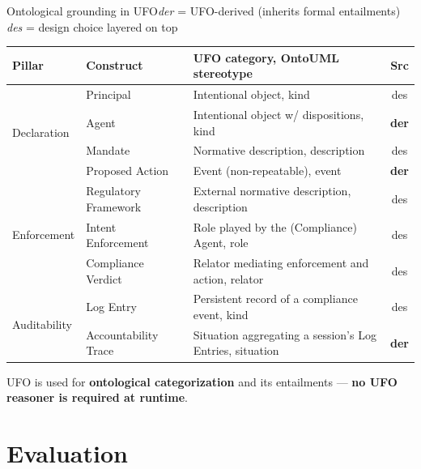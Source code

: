 \documentclass[aspectratio=169,10pt]{beamer}
\newcommand{\uml}[1]{\guillemotleft #1\guillemotright}
\newcommand{\key}[1]{\textcolor{aiAccent}{\textbf{#1}}}
\begin{document}
\begin{frame}{Ontological grounding in UFO}{\emph{der} = UFO-derived (inherits formal entailments) \quad \emph{des} = design choice layered on top}
  \centering\small
  \begin{tabularx}{0.97\textwidth}{@{}llXc@{}}
    \toprule
    \textbf{Pillar} & \textbf{Construct} & \textbf{UFO category, OntoUML stereotype} & \textbf{Src}\\
    \midrule
    \multirow{4}{*}{Declaration}
      & Principal            & Intentional object, \uml{kind}                                & des \\
      & Agent                & Intentional object w/ dispositions, \uml{kind}                & \textbf{der} \\
      & Mandate              & Normative description, \uml{description}                      & des \\
      & Proposed Action      & Event (non-repeatable), \uml{event}                           & \textbf{der} \\
    \midrule
    \multirow{3}{*}{Enforcement}
      & Regulatory Framework & External normative description, \uml{description}             & des \\
      & Intent Enforcement   & Role played by the (Compliance) Agent, \uml{role}             & des \\
      & Compliance Verdict   & Relator mediating enforcement and action, \uml{relator}       & des \\
    \midrule
    \multirow{2}{*}{Auditability}
      & Log Entry            & Persistent record of a compliance event, \uml{kind}           & des \\
      & Accountability Trace & Situation aggregating a session's Log Entries, \uml{situation}& \textbf{der} \\
    \bottomrule
  \end{tabularx}
  \vspace{0.7em}

  \small UFO is used for \key{ontological categorization} and its entailments ---
  \key{no UFO reasoner is required at runtime}.
\end{frame}

\section{Evaluation}
\end{document}
